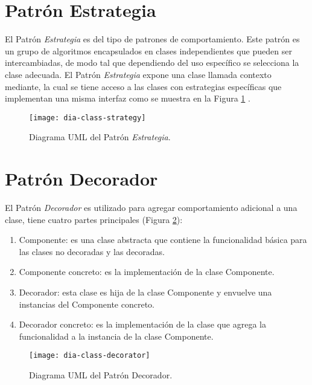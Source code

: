 \section{Patrón Estrategia}\label{sec:strategy}
El Patrón \textit{Estrategia} es del tipo de patrones de comportamiento. Este patrón es un grupo de algoritmos encapsulados en clases independientes que pueden ser intercambiadas, de modo tal que dependiendo del uso específico se selecciona la clase adecuada. El Patrón \textit{Estrategia} expone una clase llamada contexto mediante, la cual se tiene acceso a las clases con estrategias específicas que implementan una misma interfaz como se muestra en la Figura \ref{fig:dia-class-strategy} \cite{DesignPatternsLasater, DesignPatterns}.
\begin{figure}[h]
  \centering
  \texttt{[image: dia-class-strategy]}
  \caption{Diagrama UML del Patrón \textit{Estrategia}\cite{DesignPatternsLasater}.}
  \label{fig:dia-class-strategy}
\end{figure}
\section{Patrón Decorador}\label{sec:decorator}
El Patrón \textit{Decorador} es utilizado para agregar comportamiento adicional a una clase, tiene cuatro partes principales\cite{DesignPatternsLasater} (Figura \ref{fig:dia-class-decorator}):
\begin{enumerate}
  \item Componente: es una clase abstracta que contiene la funcionalidad básica para las clases no decoradas y las decoradas.
  \item Componente concreto: es la implementación de la clase Componente.
  \item Decorador: esta clase es hija de la clase Componente y envuelve una instancias del Componente concreto.
  \item Decorador concreto: es la implementación de la clase que agrega la funcionalidad a la instancia de la clase Componente.
\end{enumerate}
\begin{figure}[h]
  \centering
  \texttt{[image: dia-class-decorator]}
  \caption{Diagrama UML del Patrón Decorador\cite{DesignPatternsLasater}.}
  \label{fig:dia-class-decorator}
\end{figure}
